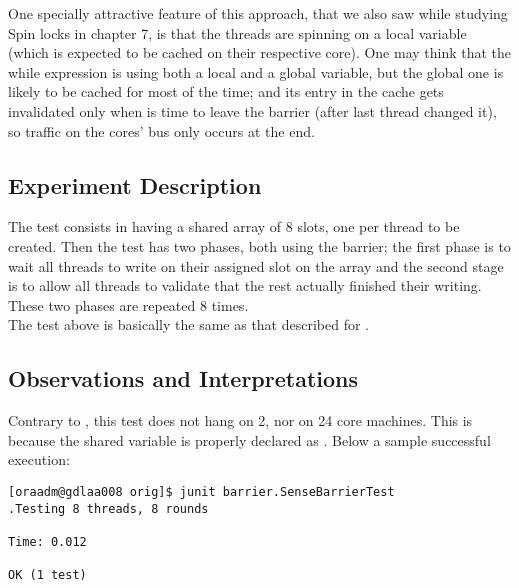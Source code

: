 One specially attractive feature of this approach, that we also saw
while studying Spin locks in chapter 7, is that the threads are spinning
on a local variable (which is expected to be cached on their
respective core). One may think that the while expression is using
both a local and a global variable, but the global one is likely to be
cached for most of the time; and its entry in the cache gets
invalidated only when is time to leave the barrier (after last thread
changed it), so traffic on the cores' bus only occurs at the end. 

\subsection{Experiment Description}
The test consists in having a shared array of 8 slots, one per thread
to be created. Then the test has two phases, both using the barrier;
the first phase is to wait all threads to write on their assigned slot
on the array and the second stage is to allow all threads to validate
that the rest actually finished their writing. These two phases are
repeated 8 times. \\

The test above is basically the same as that described for
.

\subsection{Observations and Interpretations}
Contrary to , this test does not hang on 2, nor on 24
core machines. This is because the shared variable  is
properly declared as . Below a sample successful
execution: \\

\begin{verbatim}
[oraadm@gdlaa008 orig]$ junit barrier.SenseBarrierTest
.Testing 8 threads, 8 rounds

Time: 0.012

OK (1 test)
\end{verbatim}
\hfill


